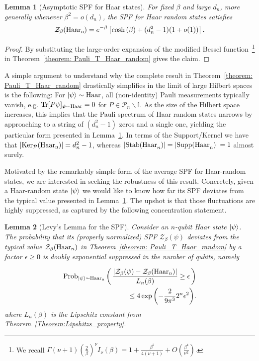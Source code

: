 \documentclass[aps,pra,superscriptaddress,twocolumn,longbibliography]{revtex4-2}
\newcommand{\tr}{{\rm Tr}}
\newtheorem{lemma}{\textbf{Lemma}}
\begin{document}
\begin{lemma}[Asymptotic SPF for Haar states]\label{lemma:Haar_PT_asymptotics}
For fixed $\beta$ and large $d_{n}$, more generally whenever $\beta^{2}=o(d_{n})$, the SPF for Haar random states satisfies 
%
\begin{equation}   
\mathcal{Z}_{\beta}({\rm{Haar}_{n}})= e^{-\beta}\left[\cosh{(\beta)}+ (d_{n}^{2}-1)(1+o(1))\right].
\end{equation}
\end{lemma}
%
\begin{proof}
By substituting the large-order expansion of the modified Bessel function~\footnote{We recall $\Gamma(\nu+1)\left(\frac{2}{\beta}\right)^\nu I_\nu(\beta)= 1+\frac{\beta^2}{4(\nu+1)} +O\left(\frac{\beta^4}{\nu^2}\right).$} in Theorem~\ref{theorem: Pauli_T_Haar_random} gives the claim. 
\end{proof} 
%
A simple argument to understand why the complete result in Theorem~\ref{theorem: Pauli_T_Haar_random} drastically simplifies in the limit of large Hilbert spaces is the following: For $\ket{\psi} \sim \text{Haar}$, all (non-identity) Pauli measurements typically vanish, e.g. $\tr[P\psi]_{\psi\sim \text{Haar}}=0$ for $P \in \mathcal{P}_{n} \backslash \mathbb{I}$.  As the size of the Hilbert space increases, this implies that the Pauli spectrum of Haar random states narrows by approaching to a string of $(d_{n}^{2}-1)$ zeros and a single one, yielding the particular form presented in Lemma~\ref{lemma:Haar_PT_asymptotics}. In terms of the Support/Kernel we have that $|{\rm Ker}_{\mathcal{P}}({\rm Haar_{n})}|=d_{n}^{2}-1$, whereas $|{\rm Stab(Haar}_{n})|=|{\rm Supp} {\rm(Haar}_{n})|=1$ almost surely. 

Motivated by the remarkably simple form of the average SPF for Haar-random states, we are interested in seeking the robustness of this result. Concretely, given a Haar-random state $\ket{\psi}$ we would like to know how far its SPF deviates from the typical value presented in Lemma~\ref{lemma:Haar_PT_asymptotics}. The upshot is that those fluctuations are highly suppressed, as captured by the following concentration statement.

\begin{lemma}[Levy's Lemma for the SPF]\label{lemma:Haar_concentration}
Consider an $n$-qubit Haar state $\ket{\psi}$. The probability that its (properly normalized) SPF $\mathcal{Z}_{\beta}(\psi)$ deviates from the typical value $\mathcal{Z}_{\beta}({\rm Haar}_{n})$ in Theorem~\ref{theorem: Pauli_T_Haar_random}
by a factor $\epsilon \geq 0$ is doubly exponential suppressed in the number of qubits, namely

\begin{align*}
    {\rm Prob}_{\ket{\psi}\sim \rm{Haar}_{n}}\left(\,\frac{|\mathcal{Z}_{\beta}(\psi)-\mathcal{Z}_{\beta}({{\rm Haar}_{n}}) |}{L_{n}(\beta)}\geq \epsilon\, \right)& \\ \nonumber
    \leq 4\exp{\left( -\frac{2}{9\pi^{3}}2^{n}\epsilon^{2}\right)}.
\end{align*}
%
where $L_{n}(\beta)$ is the Lipschitz constant from Theorem~\ref{Theorem:Lipshitzs_property}.
\end{lemma}
\end{document}
